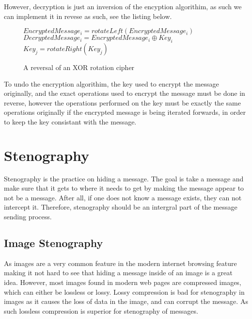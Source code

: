 \documentclass[12pt]{article}
\begin{document}
    However, decryption is just an inversion of the encyption algorithim,
    as such we can implement it in revese as such, see the listing below.

    \begin{figure}[h]
    \begin{algorithmic}[1]
      \State $EncryptedMessage_i = rotateLeft(EncryptedMessage_i)$
      \State $DecryptedMessage_i = EncryptedMessage_i \oplus Key_i$
          \State $Key_j = rotateRight(Key_j)$
        \EndFor
      \EndIf
    \EndFor
    \end{algorithmic}
    \caption{A reversal of an XOR rotation cipher}
    \end{figure}

    To undo the encryption algorithim, the key used to encrypt the message
    originally, and the exact operations used to encrypt the message must
    be done in reverse, however the operations performed on the key must be
    exactly the same operations originally if the encrypted message is being
    iterated forwards, in order to keep the key consistant with the message.
      
\section{Stenography}
  Stenography is the practice on hiding a message. The goal is take
  a message and make sure that it gets to where it needs to get by
  making the message appear to not be a message. After all, if one
  does not know a message exists, they can not intercept it. Therefore,
  stenography should be an intergral part of the message sending process.
  
  \subsection{Image Stenography}
    As images are a very common feature in the modern internet browsing
    feature making it not hard to see that hiding a message inside of an
    image is a great idea. However, most images found in modern web pages
    are compressed images, which can either be lossless or lossy. Lossy
    compression is bad for stenography in images as it causes the loss
    of data in the image, and can corrupt the message. As such lossless
    compression is superior for stenography of messages.
\end{document}
